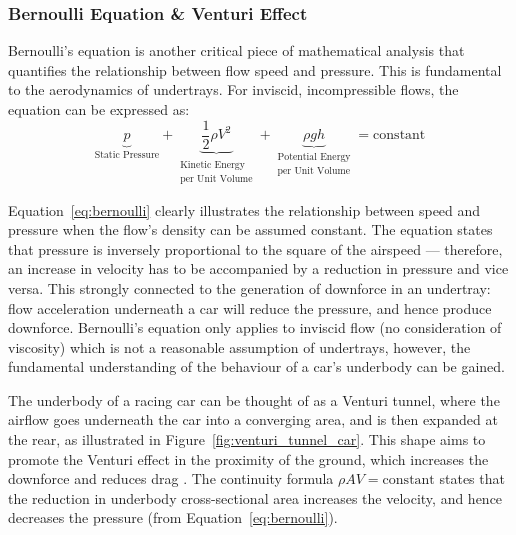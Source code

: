 \subsubsection{Bernoulli Equation \& Venturi Effect}
Bernoulli's equation is another critical piece of mathematical analysis that quantifies the relationship between flow speed and pressure. This is fundamental to the aerodynamics of undertrays. For inviscid, incompressible flows, the equation can be expressed as:
\begin{equation}
   \underbrace{p}_\textrm{Static Pressure} + \underbrace{\frac{1}{2} \rho V^{2}}_{\substack{\text{Kinetic Energy} \\ \text{per Unit Volume}}} + \underbrace{\rho g h}_{\substack{\text{Potential Energy} \\ \text{per Unit Volume}}} = \text{constant}
    \label{eq:bernoulli}
\end{equation}

\noindent Equation~\ref{eq:bernoulli} clearly illustrates the relationship between speed and pressure when the flow's density can be assumed constant. The equation states that pressure is inversely proportional to the square of the airspeed --- therefore, an increase in velocity has to be accompanied by a reduction in pressure and vice versa. This strongly connected to the generation of downforce in an undertray: flow acceleration underneath a car will reduce the pressure, and hence produce downforce.  Bernoulli's equation only applies to inviscid flow (no consideration of viscosity) which is not a reasonable assumption of undertrays, however, the fundamental understanding of the behaviour of a car's underbody can be gained.

\noindent The underbody of a racing car can be thought of as a Venturi tunnel, where the airflow goes underneath the car into a converging area, and is then expanded at the rear, as illustrated in Figure~\ref{fig:venturi_tunnel_car}. This shape aims to promote the Venturi effect in the proximity of the ground, which increases the downforce and reduces drag \cite{Katz2005AerodynamicsCars}. The continuity formula $\rho AV = \text{constant}$ states that the reduction in underbody cross-sectional area increases the velocity, and hence decreases the pressure (from Equation~\ref{eq:bernoulli}).

